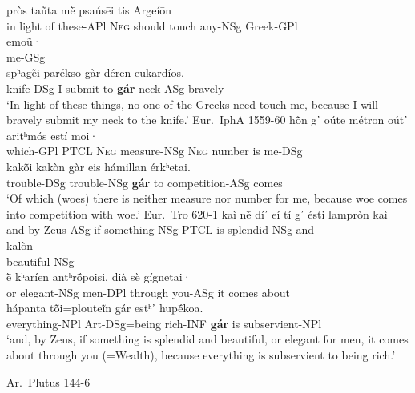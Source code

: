 \documentclass[output=paper,
modfonts
]{LSP/langsci}
\begin{document}
\begin{exe}
\ex\label{lategar}
	\begin{xlist}
	\ex\gll pròs taũta mḕ psaúsēi tis Argeíōn \\
			{in light of} these-APl \textsc{Neg} {should touch} any-NSg Greek-GPl \\

		\gll \hspace*{1em} emoũ· \\
			{} me-GSg \\
	
		\gll {\ob}spʰagē̃i paréksō gàr dérēn eukardíōs. \\
			{\db}knife-DSg {I submit to} \textbf{gár} neck-ASg bravely \\
		\glt `In light of these things, no one of the Greeks need touch me, because I will bravely submit my neck to the knife.' \hfill {Eur.\ IphA 1559-60}
	\ex\gll hō̃n g᾿ oúte métron oút᾿ aritʰmós estí moi· \\
			which-GPl PTCL \textsc{Neg} measure-NSg \textsc{Neg} number is me-DSg \\

		\gll {\ob}kakō̃i kakòn gàr eis hámillan érkʰetai. \\
			{\db}trouble-DSg trouble-NSg \textbf{gár} to competition-ASg comes \\
		\glt `Of which (woes) there is neither measure nor number for me, because woe comes into competition with woe.' \hfill {Eur.\ Tro 620-1}
	\ex\gll kaì nḕ dí᾽ eí tí g᾽ ésti lampròn kaì \\
			and by Zeus-ASg if something-NSg PTCL is splendid-NSg and \\

		\gll \hspace*{1em} kalòn \\
			 {} beautiful-NSg\\
			
		\gll ḕ kʰaríen antʰrṓpoisi, dià sè gígnetai· \\
			or elegant-NSg men-DPl through you-ASg {it comes about} \\
			
		\gll {\ob}hápanta{\cb} tō̃i=plouteĩn gár estʰ᾽ hupḗkoa. \\
			{\db}everything-NPl {Art-DSg=being rich-INF} \textbf{gár} is subservient-NPl \\
		\glt `and, by Zeus, if something is splendid and beautiful, or elegant for men, it comes about through you (=Wealth), because
everything is subservient to being rich.'

		\vspace*{-\baselineskip}\hfill {Ar.\ Plutus 144-6}
	\end{xlist}
\end{exe}
\end{document}
